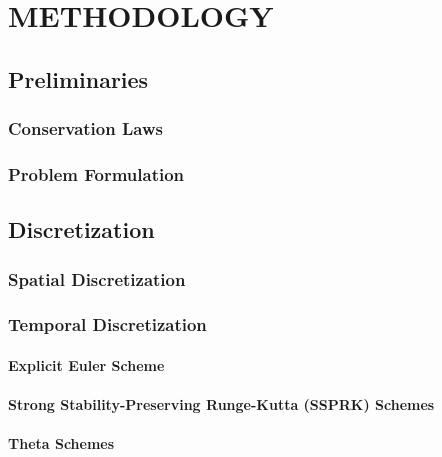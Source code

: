 \chapter{METHODOLOGY}

\section{Preliminaries}
  \subsection{Conservation Laws}
    
  \subsection{Problem Formulation}
    
\section{Discretization}
  \subsection{Spatial Discretization}\label{sec:spatial_discretization}
    
  \subsection{Temporal Discretization}\label{sec:temporal_discretization}
    \subsubsection{Explicit Euler Scheme}
      
    \subsubsection{Strong Stability-Preserving Runge-Kutta (SSPRK)
      Schemes\label{sec:ssprk}}
      
    \subsubsection{Theta Schemes\label{sec:theta}}
      
  
